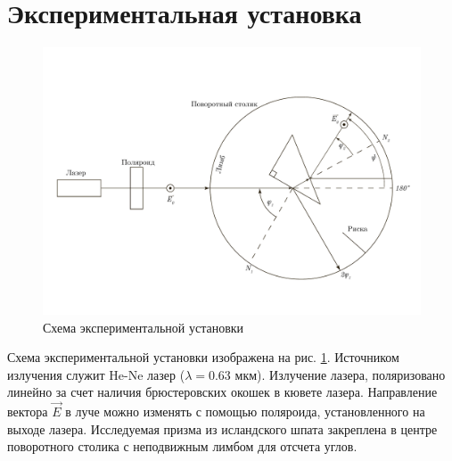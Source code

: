 \documentclass[a4paper, 12pt]{article}
\begin{document}
	\section{Экспериментальная установка}
	\begin{figure}[h]
		\centering
		\includegraphics[scale=0.4]{ExperimentalScheme.pdf}
		\caption{Схема экспериментальной установки}
		\label{fig:mainScheme}
	\end{figure}
	Схема экспериментальной установки изображена на рис. \ref{fig:mainScheme}. Источником излучения служит He-Ne лазер ($\lambda=0.63$ мкм). Излучение лазера, поляризовано линейно за счет наличия брюстеровских окошек в кювете лазера. Направление вектора  $\vec{E}$ в луче можно изменять с помощью поляроида, установленного на выходе лазера. Исследуемая призма из исландского шпата закреплена в центре поворотного столика с неподвижным лимбом для отсчета углов.
\end{document}

